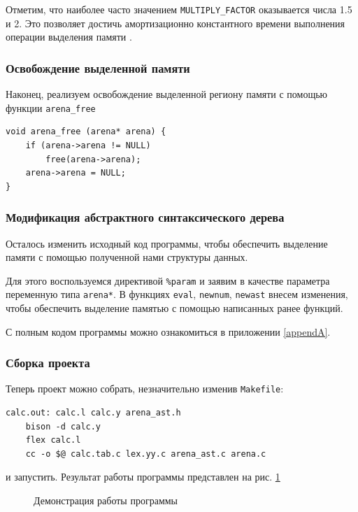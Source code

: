 \documentclass[coursework]{SCWorks}
\begin{document}
Отметим, что наиболее часто значением \texttt{MULTIPLY\_FACTOR} оказывается числа 1.5 и 2. Это позволяет достичь амортизационно константного времени выполнения операции выделения памяти \cite{refer2}.

\subsubsection{Освобождение выделенной памяти}

Наконец, реализуем освобождение выделенной региону памяти с помощью функции \texttt{arena\_free}

\begin{verbatim}
void arena_free (arena* arena) {
    if (arena->arena != NULL)
        free(arena->arena);
    arena->arena = NULL;
}
\end{verbatim}

\subsubsection{Модификация абстрактного синтаксического дерева}

Осталось изменить исходный код программы, чтобы обеспечить выделение памяти с помощью полученной нами структуры данных.

Для этого воспользуемся директивой \texttt{\%param} и заявим в качестве параметра переменную типа \texttt{arena*}. В функциях \texttt{eval}, \texttt{newnum}, \texttt{newast} внесем изменения, чтобы обеспечить выделение памятью с помощью написанных ранее функций. 

С полным кодом программы можно ознакомиться в приложении \ref{appendA}.

\subsubsection{Сборка проекта}

Теперь проект можно собрать, незначительно изменив \texttt{Makefile}:
\begin{verbatim}
calc.out: calc.l calc.y arena_ast.h
    bison -d calc.y
    flex calc.l
    cc -o $@ calc.tab.c lex.yy.c arena_ast.c arena.c
\end{verbatim}
и запустить. Результат работы программы представлен на рис. \ref{pic6}

\begin{figure}[H]
	\caption{Демонстрация работы программы}
	\label{pic6}
\end{figure}
\end{document}
